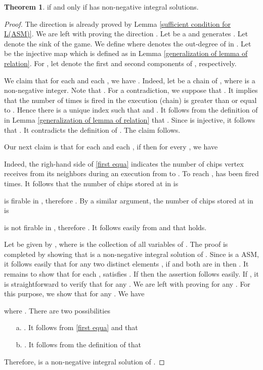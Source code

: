 \documentclass{article}
\theoremstyle{definition}
\newtheorem{theo}{Theorem}
\begin{document}
\begin{theo}
\label{necessary and sufficient condition for ASM}
 if and only if  has non-negative integral solutions.
\end{theo}
\begin{proof}
The direction  is already proved by Lemma \ref{sufficient condition for L(ASM)}. We are left with proving the direction . Let  be a  and generates . Let  denote the sink of the game. We define 
\noindent where  denotes the out-degree of  in . Let  be the injective map which is defined as in Lemma \ref{generalization of lemma of relation}. For , let  denote the first and second components of , respectively. 

We claim that for each  and each , we have . Indeed, let  be a chain of , where  is a non-negative integer. Note that . For a contradiction, we suppose that . It implies that the number of times  is fired in the execution (chain) is greater than or equal to . Hence there is a unique index  such that  and . It follows from the definition of  in Lemma \ref{generalization of lemma of relation} that . Since  is injective, it follows that . It contradicts the definition of . The claim follows. 

Our next claim is that for each  and each , if  then for every , we have

Indeed, the righ-hand side of \eqref{first equa} indicates the number of chips vertex  receives from its neighbors during an execution from  to . To reach ,  has been fired  times. It follows that the number of chips stored at  in  is

 is firable in , therefore . By a similar argument, the number of chips stored at  in  is

 is not firable in , therefore . It follows easily from  and  that  holds. 

Let  be given by
, where  is the collection of all variables of . The proof is completed by showing that  is a non-negative integral solution of . Since  is a ASM, it follows easily that for any two distinct elements , if  and  both are in  then .  It remains to show that for each ,  satisfies . If  then the assertion follows easily. If , it is straightforward to verify that  for any . We are left with proving  for any . For this purpose, we show that  for any . We have

where . There are two possibilities
\begin{itemize}
  \item[a. ]. It follows from \eqref{first equa} and  that 

\item[b. ] . It follows from the definition of  that 

\end{itemize}  
Therefore,  is a non-negative integral solution of .
\end{proof}
\end{document}
